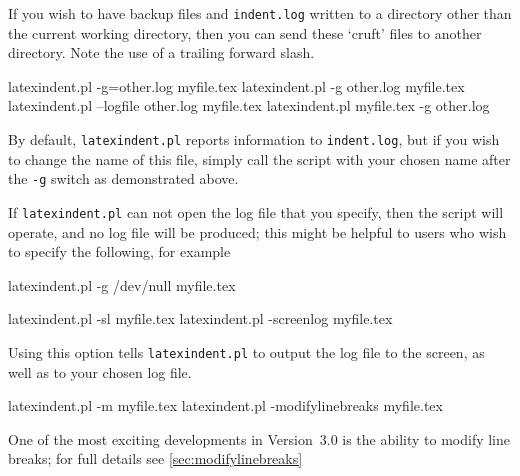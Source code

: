 	If you wish to have backup files and \texttt{indent.log} written to a directory other
	than the current working directory, then you can send these `cruft' files to another
	directory. Note the use of a trailing forward slash. %

	\begin{commandshell}
latexindent.pl -g=other.log myfile.tex
latexindent.pl -g other.log myfile.tex
latexindent.pl --logfile other.log myfile.tex
latexindent.pl myfile.tex -g other.log 
\end{commandshell}

	By default, \texttt{latexindent.pl} reports information to \texttt{indent.log}, but if
	you wish to change the name of this file, simply call the script with your chosen name
	after the \texttt{-g} switch as demonstrated above.

	 If \texttt{latexindent.pl} can not open
	the log file that you specify, then the script will operate, and no log file will be
	produced; this might be helpful to users who wish to specify the following, for example
	\begin{commandshell}
latexindent.pl -g /dev/null myfile.tex
\end{commandshell}

	\begin{commandshell}
latexindent.pl -sl myfile.tex
latexindent.pl -screenlog myfile.tex
\end{commandshell}
	Using this  option tells
	\texttt{latexindent.pl} to output the log file to the screen, as well as to your chosen
	log file.%

	\begin{commandshell}
latexindent.pl -m myfile.tex
latexindent.pl -modifylinebreaks myfile.tex
\end{commandshell}

	One of the most exciting developments in Version~3.0 is the ability to modify line
	breaks; for full details see \vref{sec:modifylinebreaks}

